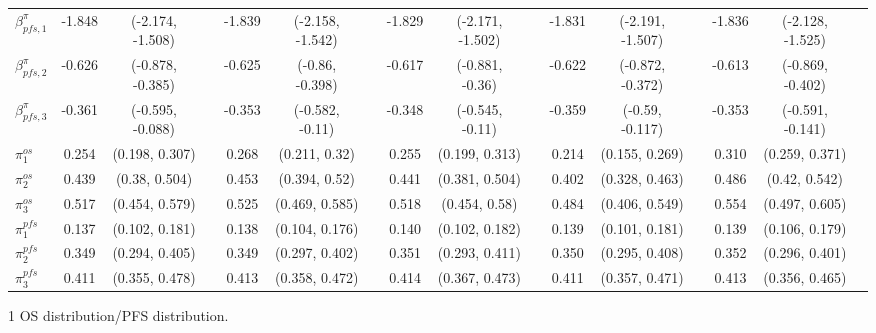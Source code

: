 \documentclass[AMA,STIX1COL]{WileyNJD-v2}
\begin{document}
\begin{landscape}
\begin{center}
\begin{table}[t]
\begin{tabular}{l c c c c c c c c c c c c c c c}
$\beta^{\pi}_{pfs, 1}$ & -1.848 & (-2.174, -1.508) &  & -1.839 & (-2.158, -1.542) &  & -1.829 & (-2.171, -1.502) &  & -1.831 & (-2.191, -1.507) &  & -1.836 & (-2.128, -1.525) & \\
$\beta^{\pi}_{pfs, 2}$ & -0.626 & (-0.878, -0.385) &  & -0.625 & (-0.86, -0.398) &  & -0.617 & (-0.881, -0.36) &  & -0.622 & (-0.872, -0.372) &  & -0.613 & (-0.869, -0.402) & \\
$\beta^{\pi}_{pfs, 3}$ & -0.361 & (-0.595, -0.088) &  & -0.353 & (-0.582, -0.11) &  & -0.348 & (-0.545, -0.11) &  & -0.359 & (-0.59, -0.117) &  & -0.353 & (-0.591, -0.141) & \\
$\pi^{os}_1$ & 0.254 & (0.198, 0.307) &  & 0.268 & (0.211, 0.32) &  & 0.255 & (0.199, 0.313) &  & 0.214 & (0.155, 0.269) &  & 0.310 & (0.259, 0.371) & \\
$\pi^{os}_2$ & 0.439 & (0.38, 0.504) &  & 0.453 & (0.394, 0.52) &  & 0.441 & (0.381, 0.504) &  & 0.402 & (0.328, 0.463) &  & 0.486 & (0.42, 0.542) & \\
$\pi^{os}_3$ & 0.517 & (0.454, 0.579) &  & 0.525 & (0.469, 0.585) &  & 0.518 & (0.454, 0.58) &  & 0.484 & (0.406, 0.549) &  & 0.554 & (0.497, 0.605) & \\
$\pi^{pfs}_1$ & 0.137 & (0.102, 0.181) &  & 0.138 & (0.104, 0.176) &  & 0.140 & (0.102, 0.182) &  & 0.139 & (0.101, 0.181) &  & 0.139 & (0.106, 0.179) & \\
$\pi^{pfs}_2$ & 0.349 & (0.294, 0.405) &  & 0.349 & (0.297, 0.402) &  & 0.351 & (0.293, 0.411) &  & 0.350 & (0.295, 0.408) &  & 0.352 & (0.296, 0.401) & \\
$\pi^{pfs}_3$ & 0.411 & (0.355, 0.478) &  & 0.413 & (0.358, 0.472) &  & 0.414 & (0.367, 0.473) &  & 0.411 & (0.357, 0.471) &  & 0.413 & (0.356, 0.465) & \\
\bottomrule
\end{tabular}
\begin{tablenotes}%
\item[1] OS distribution/PFS distribution.
\end{tablenotes}
\end{table}
\end{center}
\end{landscape}
\end{document}
